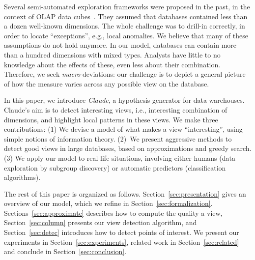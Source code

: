 Several semi-automated exploration frameworks were proposed in the
past, in the context of OLAP data cubes~\cite{sarawagi1998discovery,
imielinski2002cubegrades}. They assumed that databases contained less than a
dozen well-known dimensions.  The whole challenge was to drill-in correctly, in
order to locate ``exceptions'', e.g., local anomalies. We believe that many of
these assumptions do not hold anymore. In our model, databases can contain more
than a hundred dimensions with mixed types. Analysts have little to no
knowledge about the effects of these, even less about their combination.
Therefore, we seek \emph{macro}-deviations: our challenge is to depict a
general picture of how the measure varies across any possible view on the database.

In this paper, we introduce \textit{Claude}, a hypothesis generator for data
warehouses. Claude's aim is to detect interesting views, i.e., interesting
combination of dimensions, and highlight local patterns in these views. We make
three contributions: (1) We devise a model of what makes a view
``interesting'', using simple notions of information theory. (2)~We present
aggressive methods to detect good views in large data\-bases, based on
approximations and greedy search.  (3) We apply our model to real-life
situations, involving either humans (data exploration by subgroup discovery) or
automatic predictors (classification algorithms).

The rest of this paper is organized as follows. Section~\ref{sec:presentation}
gives an overview of our model, which we refine in
Section~\ref{sec:formalization}. Sections~\ref{sec:approximate} describes how
to compute the quality a view, Section~\ref{sec:column} presents our view
detection algorithm, and Section~\ref{sec:detec} introduces how to detect
points of interest. We present our experiments in
Section~\ref{sec:experiments}, related work in Section~\ref{sec:related} and
conclude in Section~\ref{sec:conclusion}.


